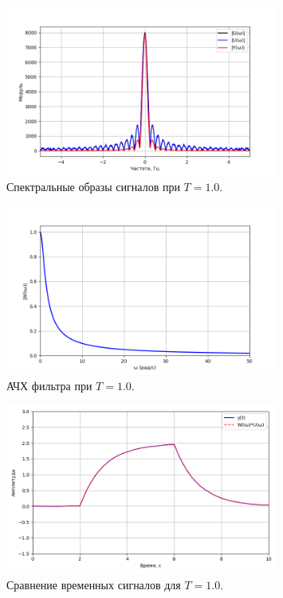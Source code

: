 \documentclass[a4paper]{article}
\begin{document}
\begin{figure}[H]
  \centering
  \includegraphics[width=0.8\textwidth]{src/task_1_1/spec_2.0_1.0.png}
  \caption{Спектральные образы сигналов при \(T=1.0\).}
  \label{fig:spec_1.0}
\end{figure}

\begin{figure}[H]
  \centering
  \includegraphics[width=0.8\textwidth]{src/task_1_1/ach_2.0_1.0.png}
  \caption{АЧХ фильтра при \(T=1.0\).}
  \label{fig:ach_1.0}
\end{figure}

\begin{figure}[H]
  \centering
  \includegraphics[width=0.8\textwidth]{src/task_1_1/time_comp_2.0_1.0.png}
  \caption{Сравнение временных сигналов для \(T=1.0\).}
  \label{fig:timecomp_1.0}
\end{figure}
\end{document}
